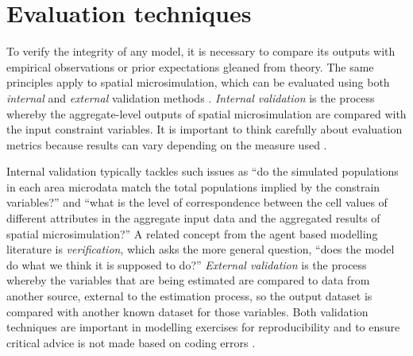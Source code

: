\documentclass[a4paper,10pt]{article}
\begin{document}


\section{Evaluation techniques}
To verify the integrity of any model, it is necessary to compare its outputs
with empirical observations or prior expectations gleaned from theory.
The same principles apply to spatial microsimulation, which can be evaluated using
both \emph{internal} and \emph{external} validation methods \citep{Edwards2009}.
\emph{Internal validation} is the process whereby
the aggregate-level outputs of spatial microsimulation are compared with
the input constraint variables. It is important to think carefully about
evaluation metrics because results can vary depending on the measure used
\citep{Voas2001}.

Internal validation typically tackles such issues
as ``do the simulated populations in each area
microdata match the total populations implied by the constrain variables?''
and ``what is the level of correspondence between the cell values of different
attributes in the aggregate input data and the aggregated results of spatial microsimulation?''
A related concept from the agent based modelling literature is
\emph{verification}, which asks the more general question,
``does the model
do what we think it is supposed to do?'' \citep[p.~131]{ormerod2009validation} 
\emph{External validation} is the process whereby the variables that are
being estimated are compared to data from another source,
external to the estimation process, so the output dataset is compared with
another known dataset for those variables.
Both validation techniques are important in modelling exercises for reproducibility and to ensure critical advice is not made
based on coding errors \citep{ormerod2009validation}.
\end{document}
